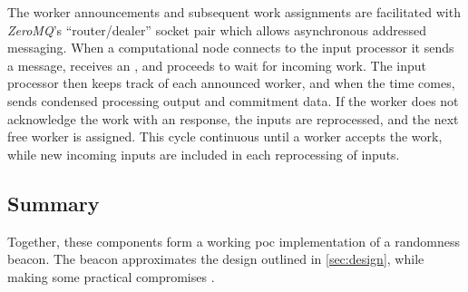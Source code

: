 The worker announcements and subsequent work assignments are facilitated with \textit{ZeroMQ}'s \enquote{router/dealer} socket pair which allows asynchronous addressed messaging.
When a computational node connects to the input processor it sends a  message, receives an , and proceeds to wait for incoming work.
The input processor then keeps track of each announced worker, and when the time comes, sends condensed processing output and commitment data.
If the worker does not acknowledge the work with an  response, the inputs are reprocessed, and the next free worker is assigned.
This cycle continuous until a worker accepts the work, while new incoming inputs are included in each reprocessing of inputs.

\subsection{Summary}
Together, these components form a working \acrshort{poc} implementation of a randomness beacon. The beacon approximates the design outlined in \cref{sec:design}, while making some practical compromises .
